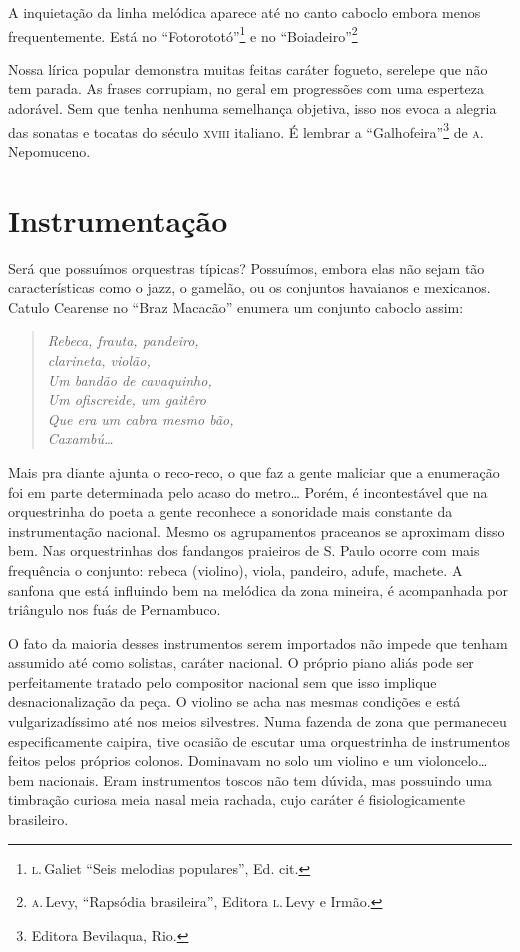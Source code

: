A inquietação da linha melódica aparece até no canto caboclo embora
menos frequentemente. Está no ``Fotorototó''\footnote{\textsc{l}.\,Galiet ``Seis melodias
populares'', Ed. cit.} e no ``Boiadeiro''\footnote{\textsc{a}.\,Levy, ``Rapsódia brasileira'',
Editora \textsc{l}.\,Levy e Irmão.}

Nossa lírica popular demonstra muitas feitas caráter fogueto, serelepe
que não tem parada. As frases corrupiam, no geral em progressões com uma
esperteza adorável. Sem que tenha nenhuma semelhança objetiva, isso nos
evoca a alegria das sonatas e tocatas do século \textsc{xviii} italiano. É lembrar
a ``Galhofeira''\footnote{Editora Bevilaqua, Rio.} de \textsc{a}.\,Nepomuceno.

\section{Instrumentação}

Será que possuímos orquestras típicas? Possuímos, embora elas não sejam
tão características como o jazz, o gamelão, ou os conjuntos havaianos e
mexicanos. Catulo Cearense no ``Braz Macacão'' enumera um conjunto caboclo
assim:

\begin{verse}
\textit{Rebeca, frauta, pandeiro,}\\
\textit{clarineta, violão,}\\
\textit{Um bandão de cavaquinho,}\\
\textit{Um ofiscreide, um gaitêro}\\
\textit{Que era um cabra mesmo bão,}\\
\textit{Caxambú\ldots{}}
\end{verse}

Mais pra diante ajunta o reco-reco, o que faz a gente maliciar que a
enumeração foi em parte determinada pelo acaso do metro\ldots{} Porém, é
incontestável que na orquestrinha do poeta a gente reconhece a
sonoridade mais constante da instrumentação nacional. Mesmo os
agrupamentos praceanos se aproximam disso bem. Nas orquestrinhas dos
fandangos praieiros de S. Paulo ocorre com mais frequência o conjunto:
rebeca (violino), viola, pandeiro, adufe, machete. A sanfona que está
influindo bem na melódica da zona mineira, é acompanhada por triângulo
nos fuás de Pernambuco.

O fato da maioria desses instrumentos serem importados não impede que
tenham assumido até como solistas, caráter nacional. O próprio piano
aliás pode ser perfeitamente tratado pelo compositor nacional sem que
isso implique desnacionalização da peça. O violino se acha nas mesmas
condições e está vulgarizadíssimo até nos meios silvestres. Numa fazenda
de zona que permaneceu especificamente caipira, tive ocasião de escutar
uma orquestrinha de instrumentos feitos pelos próprios colonos.
Dominavam no solo um violino e um violoncelo\ldots{} bem nacionais. Eram
instrumentos toscos não tem dúvida, mas possuindo uma timbração curiosa
meia nasal meia rachada, cujo caráter é fisiologicamente brasileiro.

